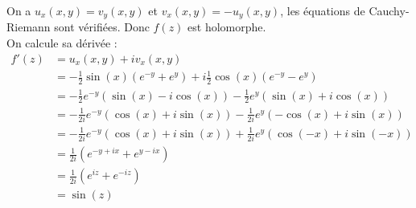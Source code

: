 On a $u_x(x,y) = v_y(x,y)$ et $v_x(x,y) = -u_y(x,y)$, les équations de Cauchy-Riemann sont vérifiées. Donc $f(z)$ est holomorphe. \\
On calcule sa dérivée :
\begin{align*}
    f'(z) &= u_x(x,y) + iv_x(x,y) \\
    &= -\frac{1}{2} \sin(x)(e^{-y} + e^y) + i\frac{1}{2} \cos(x)(e^{-y} - e^y) \\
    &= -\frac{1}{2} e^{-y} (\sin(x) - i\cos(x)) -\frac{1}{2} e^{y} (\sin(x) + i\cos(x)) \\
    &= -\frac{1}{2i} e^{-y} (\cos(x) + i\sin(x)) -\frac{1}{2i} e^{y} (-\cos(x) + i\sin(x)) \\
    &= -\frac{1}{2i} e^{-y} (\cos(x) + i\sin(x)) +\frac{1}{2i} e^{y} (\cos(-x) + i\sin(-x)) \\
    &= \frac{1}{2i}(e^{-y+ix} + e^{y-ix}) \\
    &= \frac{1}{2i}(e^{iz} + e^{-iz}) \\
    &= \sin(z)
\end{align*}